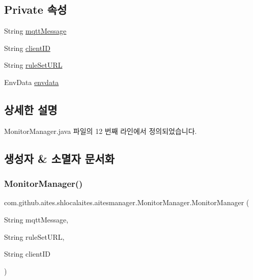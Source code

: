 \subsection*{Private 속성}
\begin{DoxyCompactItemize}
\item 
String \mbox{\hyperlink{classcom_1_1github_1_1aites_1_1shlocalaites_1_1aitesmanager_1_1_monitor_manager_aa6b372acb4521c7de09fde3877240694}{mqtt\+Message}}
\item 
String \mbox{\hyperlink{classcom_1_1github_1_1aites_1_1shlocalaites_1_1aitesmanager_1_1_monitor_manager_ac2cb1a60aa97ac0801f4241fb6ac0b14}{client\+ID}}
\item 
String \mbox{\hyperlink{classcom_1_1github_1_1aites_1_1shlocalaites_1_1aitesmanager_1_1_monitor_manager_a91d864b58034477cf84abf87943c29a5}{rule\+Set\+U\+RL}}
\item 
Env\+Data \mbox{\hyperlink{classcom_1_1github_1_1aites_1_1shlocalaites_1_1aitesmanager_1_1_monitor_manager_a47e3f99e310e396924a7f0fbef1478cb}{envdata}}
\end{DoxyCompactItemize}


\subsection{상세한 설명}


Monitor\+Manager.\+java 파일의 12 번째 라인에서 정의되었습니다.



\subsection{생성자 \& 소멸자 문서화}
\mbox{\label{classcom_1_1github_1_1aites_1_1shlocalaites_1_1aitesmanager_1_1_monitor_manager_a3b70503f8d9e30293ca873067f5ce938}} 
\subsubsection{\texorpdfstring{Monitor\+Manager()}{MonitorManager()}}
{\footnotesize\ttfamily com.\+github.\+aites.\+shlocalaites.\+aitesmanager.\+Monitor\+Manager.\+Monitor\+Manager (\begin{DoxyParamCaption}\item[{String}]{mqtt\+Message,  }\item[{String}]{rule\+Set\+U\+RL,  }\item[{String}]{client\+ID }\end{DoxyParamCaption})}




